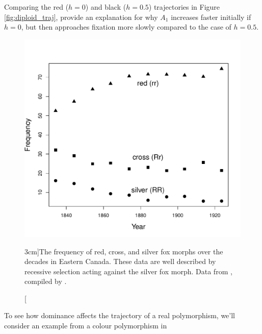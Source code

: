 \begin{question}
Comparing the red ($h=0$) and black ($h=0.5$) trajectories in Figure \ref{fig:diploid_traj}, provide an explanation for why $A_1$ increases faster initially if $h=0$, but then approaches fixation more slowly compared to the case of $h=0.5$.
\end{question}



\begin{figure}
\begin{center}
  \includegraphics[width = 0.8 \textwidth]{Journal_figs/single_locus_selection/silver_fox/fox_morph_freqs.pdf}
\end{center}
\caption[][3cm]{The frequency of red, cross, and silver fox morphs over the
  decades in Eastern Canada. These data are well described by
  recessive selection acting against the silver fox morph. Data from
  \citet{elton:42}, compiled by \citet{Allendorf:09}. } \label{fig:Fox_morph_freqs}
\end{figure}
To see how dominance affects the trajectory of a real
polymorphism, we'll consider an example from a colour polymorphism in
